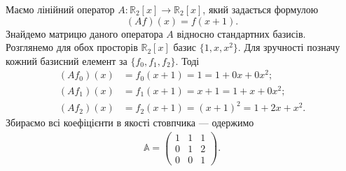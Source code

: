 \documentclass{math_library}
\begin{document}
	\begin{example}
	Маємо лінійний оператор $A \colon \mathbb{R}_2[x] \to \mathbb{R}_2[x]$, який задається формулою
	\[
	(Af)(x) = f(x+1).
	\]
	Знайдемо матрицю даного оператора $A$ відносно стандартних базисів.\\
	Розглянемо для обох просторів $\mathbb{R}_2[x]$ базис $\{1,x,x^2\}$. Для зручності позначу кожний базисний елемент за $\{f_0,f_1,f_2\}$. Тоді
	\begin{align*}
	(Af_0)(x) & = f_0(x+1) = 1 = 1 + 0x + 0x^2; \\
	(Af_1)(x) & = f_1(x+1) = x+1 = 1 + x + 0x^2; \\
	(Af_2)(x) & = f_2(x+1) = (x+1)^2 = 1 + 2x + x^2.
	\end{align*}
	Збираємо всі коефіцієнти в якості стовпчика --- одержимо
	\begin{align*}
	\mathbb{A} = \begin{pmatrix}
	1 & 1 & 1 \\
	0 & 1 & 2 \\
	0 & 0 & 1 
	\end{pmatrix}.
	\end{align*}
	\begin{center}
\end{center}
	\end{example}
	
\end{document}
